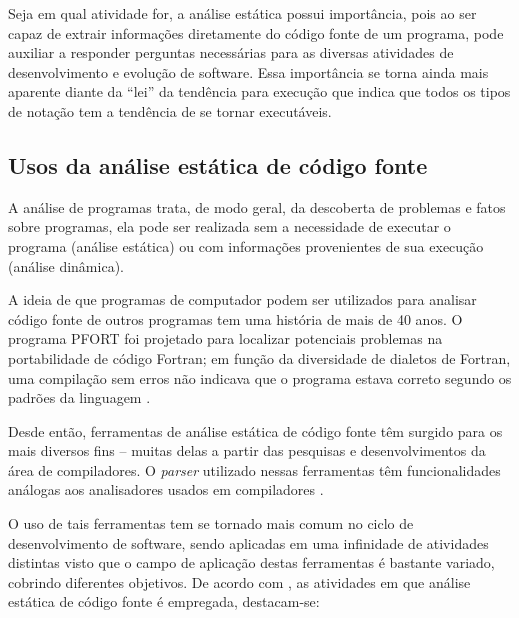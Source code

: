 Seja em qual atividade for, a análise estática possui importância,
pois ao ser capaz de extrair informações diretamente do
código fonte de um programa, pode auxiliar a responder perguntas necessárias
para as diversas atividades de desenvolvimento e evolução de software. Essa
importância se torna ainda mais aparente diante da ``lei'' da tendência para
execução \cite{Harman2010} que indica que todos os tipos de notação tem a
tendência de se tornar executáveis.

\subsection{Usos da análise estática de código fonte} \label{usos}

A análise de programas trata, de modo geral, da descoberta de problemas e
fatos sobre programas, ela pode ser realizada sem a necessidade de executar o
programa (análise estática) ou com informações provenientes de sua execução
(análise dinâmica).

A ideia de que programas de computador podem ser utilizados para analisar
código fonte de outros programas tem uma história de mais de 40 anos.  O
programa PFORT \cite{Ryder1974} foi projetado para localizar potenciais
problemas na portabilidade de código Fortran; em função da diversidade de
dialetos de Fortran, uma compilação sem erros não indicava que o programa
estava correto segundo os padrões da linguagem \cite{Wichmann1995}.

Desde então, ferramentas de análise estática de código fonte têm surgido para
os mais diversos fins -- muitas delas a partir das pesquisas e
desenvolvimentos da área de compiladores.  O {\it parser} utilizado nessas
ferramentas têm funcionalidades análogas aos analisadores usados em
compiladores \cite{Anderson2008}.

O uso de tais ferramentas tem se
tornado mais comum no ciclo de desenvolvimento de
software, sendo aplicadas em uma infinidade de atividades distintas visto que o
campo de aplicação destas ferramentas é bastante variado, cobrindo diferentes
objetivos. De acordo com , as atividades em que análise
estática de código fonte é empregada, destacam-se:

